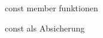 
\begin{frame}[fragile]{const member funktionen}

\begin{block}{const als Absicherung}
  \begin{tiny}
  
  \end{tiny}
\end{block}


\end{frame}
